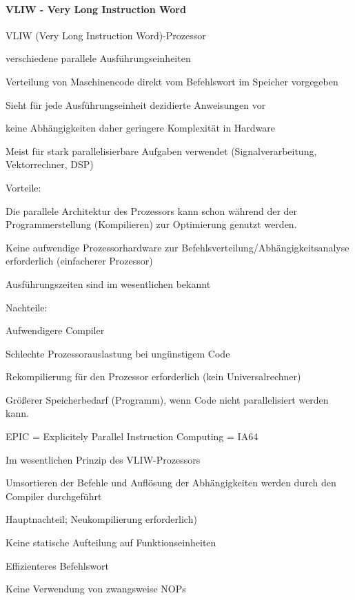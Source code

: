 \documentclass[10pt,landscape]{article}
\begin{document}
\begin{multicols}{3}
  \paragraph{ VLIW - Very Long Instruction Word}
  VLIW (Very Long Instruction Word)-Prozessor
  \begin{itemize*}
    \item verschiedene parallele Ausführungseinheiten
    \item Verteilung von Maschinencode direkt vom Befehlswort im Speicher vorgegeben
    \item Sieht für jede Ausführungseinheit dezidierte Anweisungen vor
    \item keine Abhängigkeiten daher geringere Komplexität in Hardware
    \item Meist für stark parallelisierbare Aufgaben verwendet (Signalverarbeitung, Vektorrechner, DSP)
    \item Vorteile:
    \begin{itemize*}
      \item Die parallele Architektur des Prozessors kann schon während der der Programmerstellung (Kompilieren) zur Optimierung genutzt werden.
      \item Keine aufwendige Prozessorhardware zur Befehlsverteilung/Abhängigkeitsanalyse erforderlich (einfacherer Prozessor)
      \item Ausführungszeiten sind im wesentlichen bekannt
    \end{itemize*}
    \item Nachteile:
    \begin{itemize*}
      \item Aufwendigere Compiler
      \item Schlechte Prozessorauslastung bei ungünstigem Code
      \item Rekompilierung für den Prozessor erforderlich (kein Universalrechner)
      \item Größerer Speicherbedarf (Programm), wenn Code nicht parallelisiert werden kann.
    \end{itemize*}
  \end{itemize*}
  
  
  EPIC = Explicitely Parallel Instruction Computing = IA64
  \begin{itemize*}
    \item Im wesentlichen Prinzip des VLIW-Prozessors
    \item Umsortieren der Befehle und Auflösung der Abhängigkeiten werden durch den Compiler durchgeführt
    \item Hauptnachteil; Neukompilierung erforderlich)
    \item Keine statische Aufteilung auf Funktionseinheiten
    \item Effizienteres Befehlswort \item Keine Verwendung von zwangsweise NOPs
  \end{itemize*}
  

\end{multicols}
\end{document}
